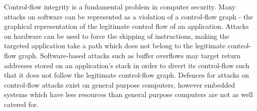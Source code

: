 Control-flow integrity is a fundamental problem in computer security. Many attacks on software can be represented as a violation of a control-flow graph - the graphical representation of the legitimate control flow of an application. Attacks on hardware can be used to force the skipping of instructions, making the targeted application take a path which does not belong to the legitimate control-flow graph. Software-based attacks such as buffer overflows may target return addresses stored on an application's stack in order to divert its control-flow such that it does not follow the legitimate control-flow graph. Defences for attacks on control-flow attacks exist on general purpose computers, however embedded systems which have less resources than general purpose computers are not as well catered for. 